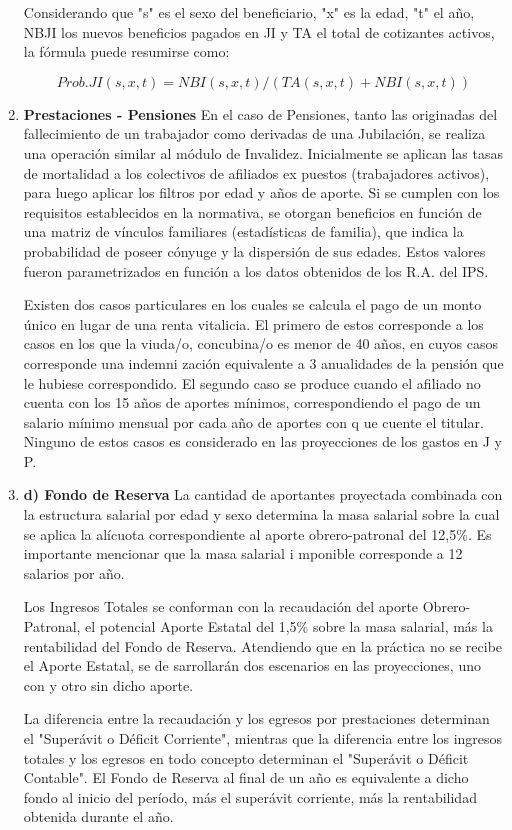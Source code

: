 \begin{enumerate}
Considerando que "s" es el sexo del beneficiario, "x" es la edad, "t" el año, NBJI los nuevos beneficios pagados en JI y TA el total de cotizantes activos, la fórmula puede resumirse como: 

$$Prob. JI (s, x, t) = NBI (s, x, t) / (TA (s, x, t) + NBI (s, x, t))$$

\item   \textbf{        Prestaciones - Pensiones}
En el caso de Pensiones, tanto las originadas del fallecimiento de un trabajador como derivadas de una Jubilación, se realiza una operación similar al módulo de Invalidez.  Inicialmente se aplican las tasas de mortalidad a los colectivos de afiliados ex
puestos (trabajadores activos), para luego aplicar los filtros por edad y años de aporte. Si se cumplen con los requisitos establecidos en la normativa, se otorgan beneficios en función de una matriz de vínculos familiares (estadísticas de familia), que
 indica la probabilidad de poseer cónyuge y la dispersión de sus edades. Estos valores fueron parametrizados en función a los datos obtenidos de los R.A. del IPS.

Existen dos casos particulares en los cuales se calcula el pago de un monto único en lugar de una renta vitalicia. El primero de estos corresponde a los casos en los que la viuda/o, concubina/o es menor de 40 años, en cuyos casos corresponde una indemni
zación equivalente a 3 anualidades de la pensión que le hubiese correspondido. El segundo caso se produce cuando el afiliado no cuenta con los 15 años de aportes mínimos, correspondiendo el pago de un salario mínimo mensual por cada año de aportes con q
ue cuente el titular. Ninguno de estos casos es considerado en las proyecciones de los gastos en J y P.

\item   \textbf{d)      Fondo de Reserva}
La cantidad de aportantes proyectada combinada con la estructura salarial por edad y sexo determina la masa salarial sobre la cual se aplica la alícuota correspondiente al aporte obrero-patronal del 12,5\%. Es importante mencionar que la masa salarial i
mponible corresponde a 12 salarios por año. 

Los Ingresos Totales se conforman con la recaudación del aporte Obrero-Patronal, el potencial Aporte Estatal del 1,5\% sobre la masa salarial, más la rentabilidad del Fondo de Reserva.  Atendiendo que en la práctica no se recibe el Aporte Estatal, se de
sarrollarán dos escenarios en las proyecciones, uno con y otro sin dicho aporte.

La diferencia entre la recaudación y los egresos por prestaciones determinan el "Superávit o Déficit Corriente", mientras que la diferencia entre los ingresos totales y los egresos en todo concepto determinan el "Superávit o Déficit Contable".  El Fondo
 de Reserva al final de un año es equivalente a dicho fondo al inicio del período, más el superávit corriente, más la rentabilidad obtenida durante el año.

\end{enumerate}
